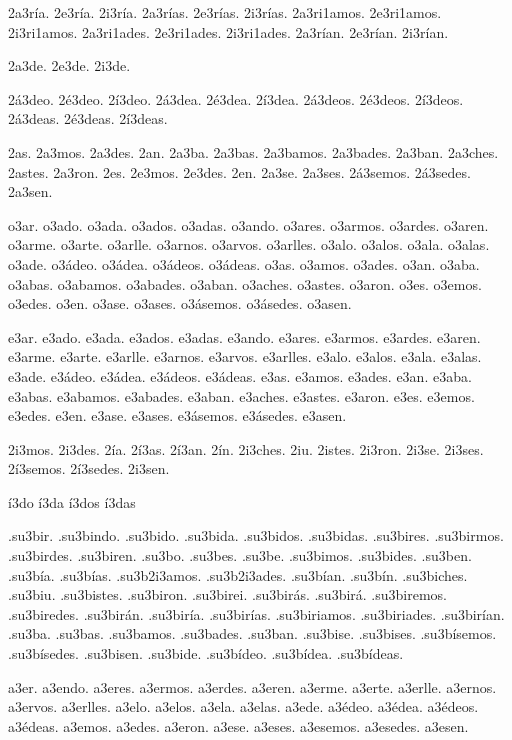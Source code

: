 {2a3ría. 2e3ría. 2i3ría. 
2a3rías. 2e3rías. 2i3rías. 
2a3ri1amos. 2e3ri1amos. 2i3ri1amos. 
2a3ri1ades. 2e3ri1ades. 2i3ri1ades. 
2a3rían. 2e3rían. 2i3rían. 

2a3de. 2e3de. 2i3de. 

2á3deo. 2é3deo. 2í3deo. 
2á3dea. 2é3dea. 2í3dea. 
2á3deos. 2é3deos. 2í3deos. 
2á3deas. 2é3deas. 2í3deas. 

2as. 2a3mos. 2a3des. 2an. 
2a3ba. 2a3bas. 2a3bamos. 2a3bades. 2a3ban. 
2a3ches. 2astes. 2a3ron. 
2es. 2e3mos. 2e3des. 2en. 
2a3se. 2a3ses. 2á3semos. 2á3sedes. 2a3sen. 

o3ar. o3ado. o3ada. o3ados. o3adas. o3ando. 
o3ares. o3armos. o3ardes. o3aren. 
o3arme. o3arte. o3arlle. o3arnos. o3arvos. o3arlles. 
o3alo. o3alos. o3ala. o3alas. 
o3ade. o3ádeo. o3ádea. o3ádeos. o3ádeas. 
o3as. o3amos. o3ades. o3an. 
o3aba. o3abas. o3abamos. o3abades. o3aban. 
o3aches. o3astes. o3aron. 
o3es. o3emos. o3edes. o3en. 
o3ase. o3ases. o3ásemos. o3ásedes. o3asen. 

e3ar. e3ado. e3ada. e3ados. e3adas. e3ando. 
e3ares. e3armos. e3ardes. e3aren. 
e3arme. e3arte. e3arlle. e3arnos. e3arvos. e3arlles. 
e3alo. e3alos. e3ala. e3alas. 
e3ade. e3ádeo. e3ádea. e3ádeos. e3ádeas. 
e3as. e3amos. e3ades. e3an. 
e3aba. e3abas. e3abamos. e3abades. e3aban. 
e3aches. e3astes. e3aron. 
e3es. e3emos. e3edes. e3en. 
e3ase. e3ases. e3ásemos. e3ásedes. e3asen. 

2i3mos. 2i3des. 
2ía. 2í3as. 2í3an. 
2ín. 2i3ches. 2iu. 2istes. 2i3ron. 
2i3se. 2i3ses. 2í3semos. 2í3sedes. 2i3sen. 

í3do í3da í3dos í3das 

.su3bir. .su3bindo. .su3bido. .su3bida. .su3bidos. .su3bidas. 
.su3bires. .su3birmos. .su3birdes. .su3biren. 
.su3bo. .su3bes. .su3be. .su3bimos. .su3bides. .su3ben. 
.su3bía. .su3bías. .su3b2i3amos. .su3b2i3ades. .su3bían. 
.su3bín. .su3biches. .su3biu. .su3bistes. .su3biron. 
.su3birei. .su3birás. .su3birá. .su3biremos. .su3biredes. .su3birán. 
.su3biría. .su3birías. .su3biriamos. .su3biriades. .su3birían. 
.su3ba. .su3bas. .su3bamos. .su3bades. .su3ban. 
.su3bise. .su3bises. .su3bísemos. .su3bísedes. .su3bisen. 
.su3bide. .su3bídeo. .su3bídea. .su3bídeas. 

a3er. a3endo. 
a3eres. a3ermos. a3erdes. a3eren. 
a3erme. a3erte. a3erlle. a3ernos. a3ervos. a3erlles. 
a3elo. a3elos. a3ela. a3elas. 
a3ede. a3édeo. a3édea. a3édeos. a3édeas. 
a3emos. a3edes. a3eron. 
a3ese. a3eses. a3esemos. a3esedes. a3esen. 
}
